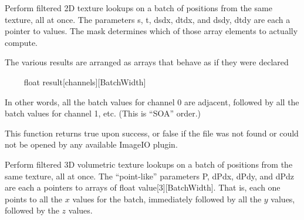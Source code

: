 Perform filtered 2D texture lookups on a batch of positions from the
same texture, all at once.  The parameters {\cf s},
{\cf t}, {\cf dsdx}, {\cf dtdx}, and {\cf dsdy}, {\cf dtdy} are each
a pointer to {\cf [BatchWidth]} values.  The {\cf mask} determines which
of those array elements to actually compute.

The various results are arranged as arrays that behave as if they were
declared

~~~~ {\cf  float result[channels][BatchWidth]}

\noindent In other words, all the batch values for channel 0 are
adjacent, followed by all the batch values for channel 1, etc. (This is
``SOA'' order.)

This function returns {\cf true} upon success, or {\cf false} if the
file was not found or could not be opened by any available ImageIO
plugin.
\apiend


Perform filtered 3D volumetric texture lookups on a batch of positions from
the same texture, all at once. The ``point-like'' parameters {\cf P}, {\cf
dPdx}, {\cf dPdy}, and {\cf dPdz} are each a pointers to arrays of
{\cf float value[3][BatchWidth]}. That is, each one points to all the $x$ values
for the batch, immediately followed by all the $y$ values, followed by the
$z$ values.

